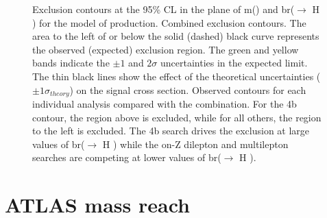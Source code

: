 \begin{figure}[htbp]
	\centering 
	\caption{
	Exclusion contours at the 95\% CL in the plane of m(\ninoone) and \gls{br}(\ninoone $\to$ H \gravino) for the model of \ninoone\ninoone production.
	Combined exclusion contours. The area to the left of or below the solid (dashed) black curve represents the observed (expected) exclusion region. The green and yellow bands indicate the $\pm1$ and $2\sigma$ uncertainties in the expected limit. The thin black lines show the effect of the theoretical uncertainties ($\pm1\sigma_{theory}$) on the signal cross section.
	Observed contours for each individual analysis compared with the combination. For the 4b contour, the region above is excluded, while for all others, the region to the left is excluded. The 4b search drives the exclusion at large values of \gls{br}(\ninoone $\to$ H \gravino) while the on-Z dilepton and multilepton searches are competing at lower values of \gls{br}(\ninoone $\to$ H \gravino).
		}
	\label{fig:limits_higgsino_cms}
\end{figure}

\FloatBarrier


\section{ATLAS mass reach}

